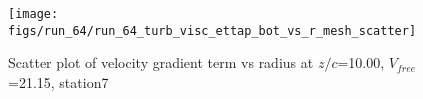 \begin{figure}[H]
\centering
\texttt{[image: figs/run\_64/run\_64\_turb\_visc\_ettap\_bot\_vs\_r\_mesh\_scatter]}
\caption{Scatter plot of velocity gradient term vs radius at $z/c$=10.00, $V_{free}$=21.15, station7}
\label{fig:run_64_turb_visc_ettap_bot_vs_r_mesh_scatter}
\end{figure}


